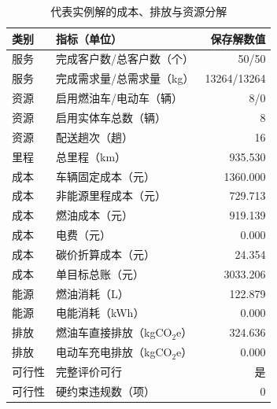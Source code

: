 \begin{table}[htbp]
  \centering
  \caption{代表实例解的成本、排放与资源分解}
  \label{tab:final-solution}
  \small
  \begin{tabular}{llr}
    \toprule
    类别 & 指标（单位） & 保存解数值\\
    \midrule
    服务 & 完成客户数/总客户数（个） & 50/50\\
    服务 & 完成需求量/总需求量（kg） & 13264/13264\\
    资源 & 启用燃油车/电动车（辆） & 8/0\\
    资源 & 启用实体车总数（辆） & 8\\
    资源 & 配送趟次（趟） & 16\\
    里程 & 总里程（km） & 935.530\\
    成本 & 车辆固定成本（元） & 1360.000\\
    成本 & 非能源里程成本（元） & 729.713\\
    成本 & 燃油成本（元） & 919.139\\
    成本 & 电费（元） & 0.000\\
    成本 & 碳价折算成本（元） & 24.354\\
    成本 & 单目标总账（元） & 3033.206\\
    能源 & 燃油消耗（L） & 122.879\\
    能源 & 电能消耗（kWh） & 0.000\\
    排放 & 燃油车直接排放（kgCO$_2$e） & 324.636\\
    排放 & 电动车充电排放（kgCO$_2$e） & 0.000\\
    可行性 & 完整评价可行 & 是\\
    可行性 & 硬约束违规数（项） & 0\\
    \bottomrule
  \end{tabular}
\end{table}

